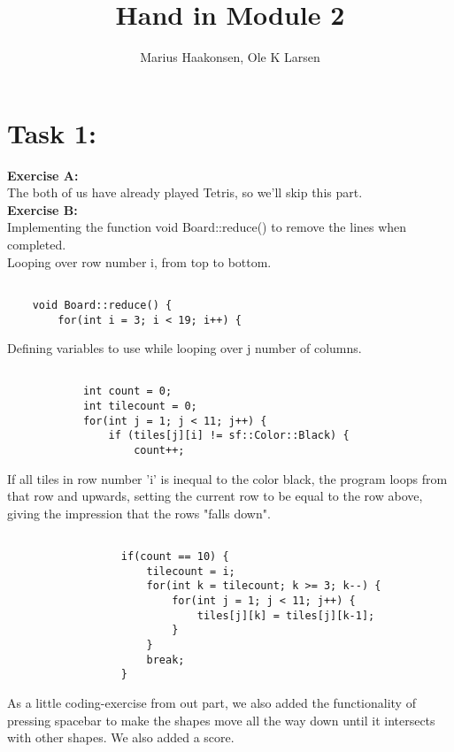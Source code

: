 \documentclass[11pt]{amsart}
\title{Hand in Module 2}
\author{Marius Haakonsen, Ole K Larsen}
\begin{document}
\maketitle

\section{Task 1:}

\textbf{Exercise A:}\\
The both of us have already played Tetris, so we'll skip this part.  \\

\textbf{Exercise B:} \\

Implementing the function void Board::reduce() to remove the lines when completed. \\

Looping over row number i, from top to bottom. \\
\begin{verbatim}

	void Board::reduce() {
	    for(int i = 3; i < 19; i++) {

\end{verbatim}

Defining variables to use while looping over j number of columns. \\
\begin{verbatim}

	        int count = 0;
	        int tilecount = 0;
	        for(int j = 1; j < 11; j++) {
	            if (tiles[j][i] != sf::Color::Black) {
	                count++;

\end{verbatim}

If all tiles in row number 'i' is inequal to the color black, the program loops from that
row and upwards, setting the current row to be equal to the row above, giving the impression that the rows "falls down". \\
\begin{verbatim}

	              if(count == 10) {
	                  tilecount = i;
	                  for(int k = tilecount; k >= 3; k--) {
	                      for(int j = 1; j < 11; j++) {
	                          tiles[j][k] = tiles[j][k-1];
	                      }
	                  }
	                  break;
	              }
\end{verbatim}

As a little coding-exercise from out part, we also added the functionality of pressing spacebar to make the shapes move all the way down
until it intersects with other shapes. We also added a score. \\
\end{document}
